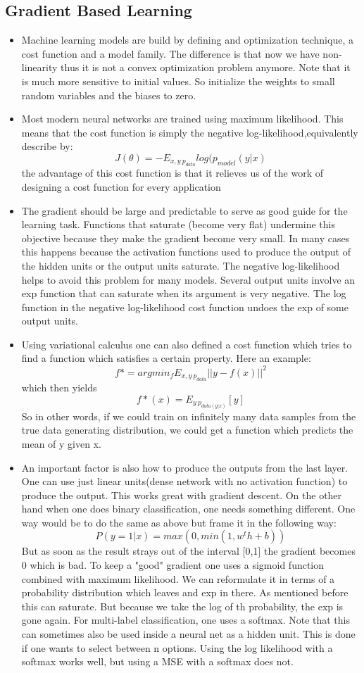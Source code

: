 \documentclass[a4paper]{article}
\begin{document}
\subsection{Gradient Based Learning}
\begin{itemize}
\item Machine learning models are build by defining and optimization technique, a cost function and a model family. The difference is that now we have non-linearity thus it is not a convex optimization problem anymore. Note that it is much more sensitive to initial values. So initialize the weights to small random variables and the biases to zero.
\item Most modern neural networks are trained using maximum likelihood. This means that the cost function is simply the negative log-likelihood,equivalently describe by: 
$$J(\theta) = -E_{x,y~p_{data}} log(p_{model}(y|x)$$
the advantage of this cost function is that it relieves us of the work of designing a cost function for every application
\item The gradient should be large and predictable to serve as good guide for the learning task. Functions that saturate (become very flat) undermine this objective because they make the gradient become very small. In many cases this happens because the activation functions used to produce the output of the hidden units or the output units saturate. The negative log-likelihood helps to avoid this problem for many models. Several output units involve an exp function that can saturate when its argument is very negative. The log function in the negative log-likelihood cost function undoes the exp of some output units.
\item Using variational calculus one can also defined a cost function which tries to find a function which satisfies a certain property. Here an example: 
$$ f* = argmin_f E_{x,y~p_{data}}||y-f(x)||^2$$ which then yields 
$$f*(x) = E_{y~p_{data(y|x)}}[y]$$
So in other words, if we could train on infinitely many data samples from the true data generating distribution, we could get a function which predicts the mean of y given x. 
\item An important factor is also how to produce the outputs from the last layer. One can use just linear units(dense network with no activation function) to produce the output. This works great with gradient descent. On the other hand when one does binary classification, one needs something different. One way would be to do the same as above but frame it in the following way: 
$$P(y=1|x) = max(0, min(1, w^th+b))$$
But as soon as the result strays out of the interval [0,1] the gradient becomes 0 which is bad. To keep a "good" gradient one uses a sigmoid function combined with maximum likelihood. We can reformulate it in terms of a probability distribution which leaves and exp in there. As mentioned before this can saturate. But because we take the log of th probability, the exp is gone again. 
For multi-label classification, one uses a softmax. Note that this can sometimes also be used inside a neural net as a hidden unit. This is done if one wants to select between n options. Using the log likelihood with a softmax works well, but using a MSE with a softmax does not.  
\end{itemize}
\end{document}
